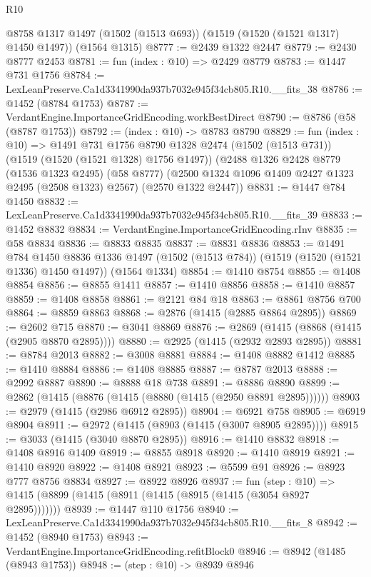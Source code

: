 \begin{lexlean}{R10}
\begin{coremodule}
    @8758
    @1317
    @1497
    (@1502 (@1513 @693))
    (@1519 (@1520 (@1521 @1317) @1450 @1497))
    (@1564 @1315)
@8777 := @2439 @1322 @2447
@8779 := @2430 @8777 @2453
@8781 := fun (index : @10) => @2429 @8779
@8783 := @1447 @731 @1756
@8784 := LexLeanPreserve.Ca1d3341990da937b7032e945f34cb805.R10.__fits_38
@8786 := @1452 (@8784 @1753)
@8787 := VerdantEngine.ImportanceGridEncoding.workBestDirect
@8790 := @8786 (@58 (@8787 @1753))
@8792 := (index : @10) -> @8783 @8790
@8829 := fun (index : @10) =>
  @1491
    @731
    @1756
    @8790
    @1328
    @2474
    (@1502 (@1513 @731))
    (@1519 (@1520 (@1521 @1328) @1756 @1497))
    (@2488
      @1326
      @2428
      @8779
      (@1536 @1323 @2495)
      (@58 @8777)
      (@2500 @1324 @1096 @1409 @2427 @1323 @2495 (@2508 @1323) @2567)
      (@2570 @1322 @2447))
@8831 := @1447 @784 @1450
@8832 := LexLeanPreserve.Ca1d3341990da937b7032e945f34cb805.R10.__fits_39
@8833 := @1452 @8832
@8834 := VerdantEngine.ImportanceGridEncoding.rInv
@8835 := @58 @8834
@8836 := @8833 @8835
@8837 := @8831 @8836
@8853 := @1491
    @784
    @1450
    @8836
    @1336
    @1497
    (@1502 (@1513 @784))
    (@1519 (@1520 (@1521 @1336) @1450 @1497))
    (@1564 @1334)
@8854 := @1410 @8754
@8855 := @1408 @8854
@8856 := @8855 @1411
@8857 := @1410 @8856
@8858 := @1410 @8857
@8859 := @1408 @8858
@8861 := @2121 @84 @18
@8863 := @8861 @8756 @700
@8864 := @8859 @8863
@8868 := @2876 (@1415 (@2885 @8864 @2895))
@8869 := @2602 @715
@8870 := @3041 @8869
@8876 := @2869 (@1415 (@8868 (@1415 (@2905 @8870 @2895))))
@8880 := @2925 (@1415 (@2932 @2893 @2895))
@8881 := @8784 @2013
@8882 := @3008 @8881
@8884 := @1408 @8882 @1412
@8885 := @1410 @8884
@8886 := @1408 @8885
@8887 := @8787 @2013
@8888 := @2992 @8887
@8890 := @8888 @18 @738
@8891 := @8886 @8890
@8899 := @2862 (@1415 (@8876 (@1415 (@8880 (@1415 (@2950 @8891 @2895))))))
@8903 := @2979 (@1415 (@2986 @6912 @2895))
@8904 := @6921 @758
@8905 := @6919 @8904
@8911 := @2972 (@1415 (@8903 (@1415 (@3007 @8905 @2895))))
@8915 := @3033 (@1415 (@3040 @8870 @2895))
@8916 := @1410 @8832
@8918 := @1408 @8916 @1409
@8919 := @8855 @8918
@8920 := @1410 @8919
@8921 := @1410 @8920
@8922 := @1408 @8921
@8923 := @5599 @91
@8926 := @8923 @777 @8756 @8834
@8927 := @8922 @8926
@8937 := fun (step : @10) =>
  @1415 (@8899 (@1415 (@8911 (@1415 (@8915 (@1415 (@3054 @8927 @2895)))))))
@8939 := @1447 @110 @1756
@8940 := LexLeanPreserve.Ca1d3341990da937b7032e945f34cb805.R10.__fits_8
@8942 := @1452 (@8940 @1753)
@8943 := VerdantEngine.ImportanceGridEncoding.refitBlock0
@8946 := @8942 (@1485 (@8943 @1753))
@8948 := (step : @10) -> @8939 @8946

\end{coremodule}
\end{lexlean}
